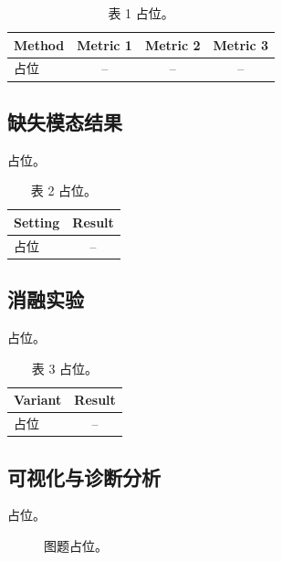 \documentclass[UTF8,twocolumn]{ctexart}
\begin{document}
\begin{table}[t]
    \centering
    \caption{表 1 占位。}
    \label{tab:main_result}
    \begin{tabular}{lccc}
        \toprule
        Method & Metric 1 & Metric 2 & Metric 3 \\
        \midrule
        占位 & -- & -- & -- \\
        \bottomrule
    \end{tabular}
\end{table}

\subsection{缺失模态结果}

占位。

\begin{table}[t]
    \centering
    \caption{表 2 占位。}
    \label{tab:missing}
    \begin{tabular}{lc}
        \toprule
        Setting & Result \\
        \midrule
        占位 & -- \\
        \bottomrule
    \end{tabular}
\end{table}

\subsection{消融实验}

占位。

\begin{table}[t]
    \centering
    \caption{表 3 占位。}
    \label{tab:ablation}
    \begin{tabular}{lc}
        \toprule
        Variant & Result \\
        \midrule
        占位 & -- \\
        \bottomrule
    \end{tabular}
\end{table}

\subsection{可视化与诊断分析}

占位。

\begin{figure}[t]
    \centering
    \caption{图题占位。}
    \label{fig:analysis}
\end{figure}
\end{document}
